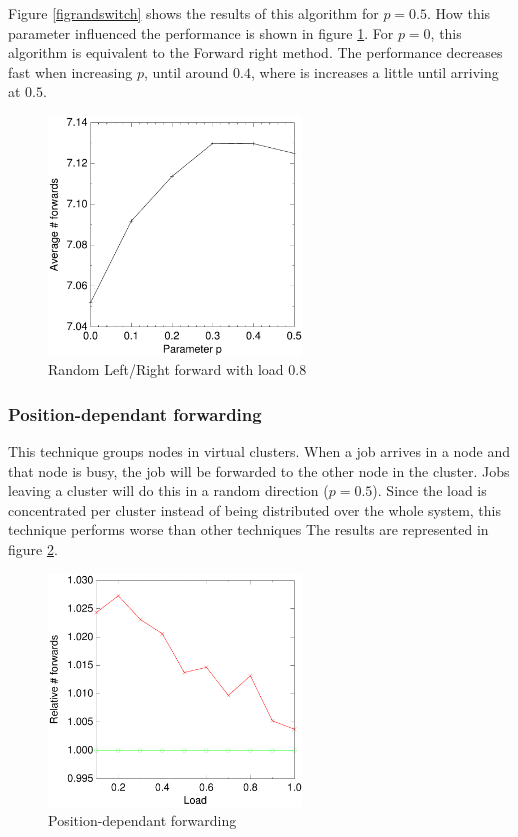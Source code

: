 \documentclass[10pt,a4paper,titlepage]{article}
\begin{document}
Figure \ref{figrandswitch} shows the results of this algorithm for $p=0.5$. How this parameter influenced the performance is shown in figure \ref{figrandswitchp}. For $p=0$, this algorithm is equivalent to the Forward right method. The performance decreases fast when increasing $p$, until around $0.4$, where is increases a little until arriving at $0.5$.

\begin{figure}[h!tb]
\centering
\includegraphics[width=0.6\textwidth]{data/randswitchp.pdf}
\caption{Random Left/Right forward with load $0.8$}
\label{figrandswitchp}
\end{figure}

\subsubsection*{Position-dependant forwarding}
This technique groups nodes in virtual clusters. When a job arrives in a node and that node is busy, the job will be forwarded to the other node in the cluster. Jobs leaving a cluster will do this in a random direction ($p=0.5$). Since the load is concentrated per cluster instead of being distributed over the whole system, this technique performs worse than other techniques The results are represented in figure \ref{figevenswitch}.

\begin{figure}[h!tb]
\centering
\includegraphics[width=0.6\textwidth]{data/evenswitchright.pdf}
\caption{Position-dependant forwarding}
\label{figevenswitch}
\end{figure}
\end{document}
